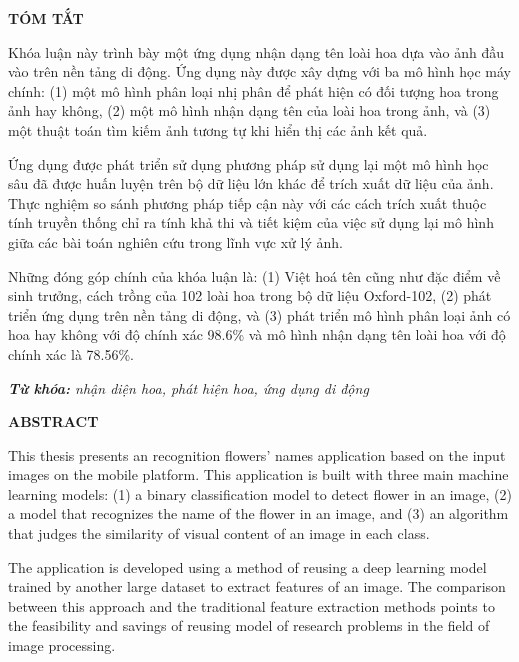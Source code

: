 \documentclass[12pt]{report}
\begin{document}
		\newpage
		\begin{center}
			\textbf{\large TÓM TẮT}
		\end{center}
																																			
		Khóa luận này trình bày một ứng dụng nhận dạng tên loài hoa dựa vào ảnh đầu vào trên nền tảng di động. Ứng dụng này được xây dựng với ba mô hình học máy chính: (1) một mô hình phân loại nhị phân để phát hiện có đối tượng hoa trong ảnh hay không, (2) một mô hình nhận dạng tên của loài hoa trong ảnh, và (3) một thuật toán tìm kiếm ảnh tương tự khi hiển thị các ảnh kết quả. 
																	
		Ứng dụng được phát triển sử dụng phương pháp sử dụng lại một mô hình học sâu đã được huấn luyện trên bộ dữ liệu lớn khác để trích xuất dữ liệu của ảnh. Thực nghiệm so sánh phương pháp tiếp cận này với các cách trích xuất thuộc tính truyền thống chỉ ra tính khả thi và tiết kiệm của việc sử dụng lại mô hình giữa các bài toán nghiên cứu trong lĩnh vực xử lý ảnh.
																	
		Những đóng góp chính của khóa luận là: (1) Việt hoá tên cũng như đặc điểm về sinh trưởng, cách trồng của 102 loài hoa trong bộ dữ liệu Oxford-102, (2) phát triển ứng dụng trên nền tảng di động, và (3) phát triển mô hình phân loại ảnh có hoa hay không với độ chính xác 98.6\% và mô hình nhận dạng tên loài hoa với độ chính xác là 78.56\%.																			
																																																																										
		\noindent \textit{\textbf{Từ khóa:} nhận diện hoa, phát hiện hoa, ứng dụng di động}
																																																																										
		\newpage
		\begin{center}
			\textbf{\large ABSTRACT}
		\end{center}
																																																																										
		This thesis presents an recognition flowers’ names application based on the input images on the mobile platform. This application is built with three main machine learning models: (1) a binary classification model to detect flower in an image, (2) a model that recognizes the name of the flower in an image, and (3) an algorithm that judges the similarity of visual content of an image in each class.
																																																																										
		The application is developed using a method of reusing a deep learning model trained by another large dataset to extract features of an image. The comparison between this approach and the traditional feature extraction methods points to the feasibility and savings of reusing model of research problems in the field of image processing.
																																																																										
\end{document}
